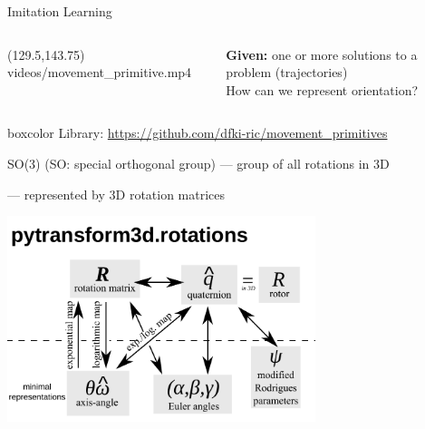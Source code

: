 \documentclass[14pt]{beamer}
\begin{document}
\begin{frame}[fragile]{Imitation Learning}
\begin{columns}
\begin{column}{0.43\textwidth}
\makebox(129.5,143.75){
{videos/movement_primitive.mp4}}
\end{column}
\begin{column}{0.55\textwidth}
\textbf{Given:} one or more solutions to a problem (trajectories)\\[1em]

How can we represent orientation?
\end{column}
\end{columns}

\vfill

\begin{beamercolorbox}[wd=\textwidth,sep=5pt]{boxcolor}
{\footnotesize Library:
\url{https://github.com/dfki-ric/movement_primitives}}
\end{beamercolorbox}
\end{frame}

\begin{frame}{SO(3) (SO: special orthogonal group)}
--- group of all rotations in 3D

--- represented by 3D rotation matrices

\vfill

\begin{center}
\includegraphics[width=9cm]{images/rotations}
\end{center}
\end{frame}
\end{document}
